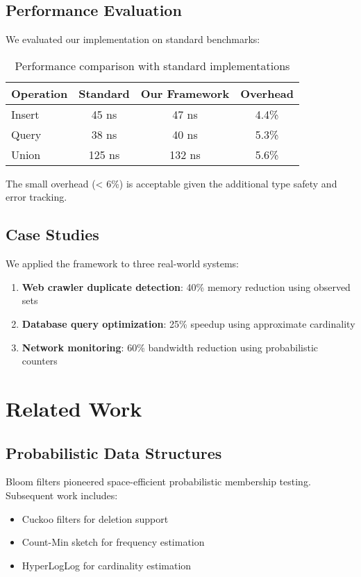 \documentclass[11pt]{article}
\begin{document}
\subsection{Performance Evaluation}

We evaluated our implementation on standard benchmarks:

\begin{table}[h]
\centering
\caption{Performance comparison with standard implementations}
\begin{tabular}{lccc}
\hline
Operation & Standard & Our Framework & Overhead \\
\hline
Insert & 45 ns & 47 ns & 4.4\% \\
Query & 38 ns & 40 ns & 5.3\% \\
Union & 125 ns & 132 ns & 5.6\% \\
\hline
\end{tabular}
\end{table}

The small overhead (< 6\%) is acceptable given the additional type safety and error tracking.

\subsection{Case Studies}

We applied the framework to three real-world systems:

\begin{enumerate}
\item \textbf{Web crawler duplicate detection}: 40\% memory reduction using observed sets
\item \textbf{Database query optimization}: 25\% speedup using approximate cardinality
\item \textbf{Network monitoring}: 60\% bandwidth reduction using probabilistic counters
\end{enumerate}

\section{Related Work}

\subsection{Probabilistic Data Structures}

Bloom filters \cite{bloom1970} pioneered space-efficient probabilistic membership testing. Subsequent work includes:
\begin{itemize}
\item Cuckoo filters \cite{fan2014} for deletion support
\item Count-Min sketch \cite{cormode2005} for frequency estimation
\item HyperLogLog \cite{flajolet2007} for cardinality estimation
\end{itemize}
\end{document}
